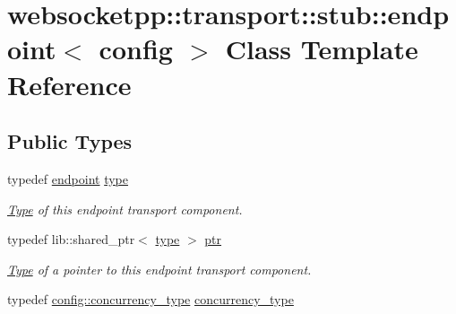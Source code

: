 \hypertarget{classwebsocketpp_1_1transport_1_1stub_1_1endpoint}{}\section{websocketpp\+:\+:transport\+:\+:stub\+:\+:endpoint$<$ config $>$ Class Template Reference}
\label{classwebsocketpp_1_1transport_1_1stub_1_1endpoint}
\subsection*{Public Types}
\begin{DoxyCompactItemize}
\item 
\mbox{\label{classwebsocketpp_1_1transport_1_1stub_1_1endpoint_af621f6f1f67f9e3eea1e0d28eb5f60ae}} 
typedef \mbox{\hyperlink{classwebsocketpp_1_1transport_1_1stub_1_1endpoint}{endpoint}} \mbox{\hyperlink{classwebsocketpp_1_1transport_1_1stub_1_1endpoint_af621f6f1f67f9e3eea1e0d28eb5f60ae}{type}}
\begin{DoxyCompactList}\small\item\em \mbox{\hyperlink{struct_type}{Type}} of this endpoint transport component. \end{DoxyCompactList}\item 
\mbox{\label{classwebsocketpp_1_1transport_1_1stub_1_1endpoint_a00a3092b0664dac9cff00785f2b96e88}} 
typedef lib\+::shared\+\_\+ptr$<$ \mbox{\hyperlink{classwebsocketpp_1_1transport_1_1stub_1_1endpoint_af621f6f1f67f9e3eea1e0d28eb5f60ae}{type}} $>$ \mbox{\hyperlink{classwebsocketpp_1_1transport_1_1stub_1_1endpoint_a00a3092b0664dac9cff00785f2b96e88}{ptr}}
\begin{DoxyCompactList}\small\item\em \mbox{\hyperlink{struct_type}{Type}} of a pointer to this endpoint transport component. \end{DoxyCompactList}\item 
\mbox{\label{classwebsocketpp_1_1transport_1_1stub_1_1endpoint_a1d70a45c1abdc4c84867a94511da067e}} 
typedef \mbox{\hyperlink{classwebsocketpp_1_1concurrency_1_1none}{config\+::concurrency\+\_\+type}} \mbox{\hyperlink{classwebsocketpp_1_1transport_1_1stub_1_1endpoint_a1d70a45c1abdc4c84867a94511da067e}{concurrency\+\_\+type}}

\end{DoxyCompactItemize}
